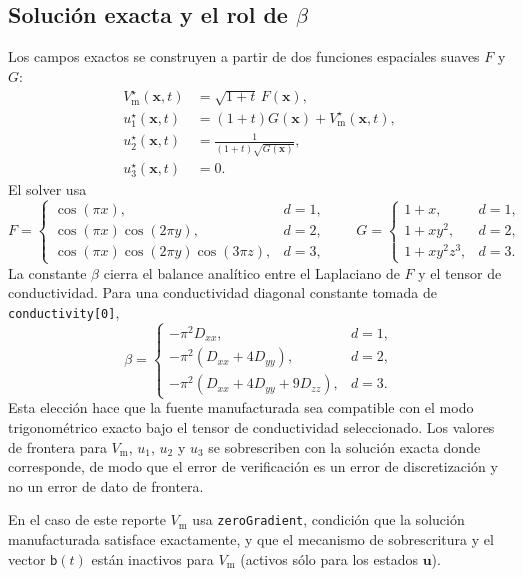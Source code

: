 \documentclass[11pt,a4paper]{article}
\newcommand{\code}[1]{\texttt{\small #1}}
\newcommand{\Vm}{V_{\text{m}}}
\begin{document}
\subsection{Solución exacta y el rol de \texorpdfstring{$\beta$}{beta}}

Los campos exactos se construyen a partir de dos funciones espaciales suaves $F$ y $G$:
\begin{align}
  \Vm^\star(\mathbf{x},t) &= \sqrt{1+t}\,F(\mathbf{x}),\\
  u_1^\star(\mathbf{x},t) &= (1+t)G(\mathbf{x})+\Vm^\star(\mathbf{x},t),\\
  u_2^\star(\mathbf{x},t) &= \frac{1}{(1+t)\sqrt{G(\mathbf{x})}},\\
  u_3^\star(\mathbf{x},t) &= 0.
\end{align}
El solver usa
\begin{equation}
F =
\begin{cases}
\cos(\pi x), & d=1,\\
\cos(\pi x)\cos(2\pi y), & d=2,\\
\cos(\pi x)\cos(2\pi y)\cos(3\pi z), & d=3,
\end{cases}
\qquad
G =
\begin{cases}
1+x, & d=1,\\
1+x y^2, & d=2,\\
1+x y^2 z^3, & d=3.
\end{cases}
\end{equation}
La constante $\beta$ cierra el balance analítico entre el Laplaciano de $F$ y el tensor de
conductividad. Para una conductividad diagonal constante tomada de \code{conductivity[0]},
\begin{equation}
  \beta =
  \begin{cases}
    -\pi^2 D_{xx}, & d=1,\\
    -\pi^2(D_{xx}+4D_{yy}), & d=2,\\
    -\pi^2(D_{xx}+4D_{yy}+9D_{zz}), & d=3.
  \end{cases}
\end{equation}
Esta elección hace que la fuente manufacturada sea compatible con el modo trigonométrico
exacto bajo el tensor de conductividad seleccionado. Los valores de frontera para $\Vm$,
$u_1$, $u_2$ y $u_3$ se sobrescriben con la solución exacta donde corresponde, de modo que
el error de verificación es un error de discretización y no un error de dato de frontera.

En el caso de este reporte $\Vm$ usa \code{zeroGradient}, condición que la solución manufacturada satisface exactamente, y que el mecanismo de sobrescritura y el vector $\mathsf{b}(t)$ están inactivos para $\Vm$ (activos sólo para los estados $\mathbf{u}$).
\end{document}
